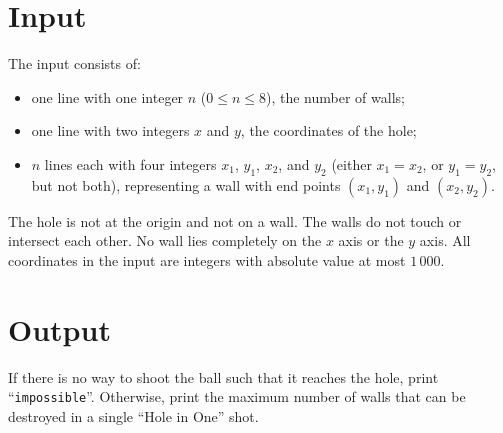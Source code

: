 \section*{Input}

The input consists of:
\begin{itemize}
\item one line with one integer $n$ ($0 \le n \le 8$), the number of walls;
\item one line with two integers $x$ and $y$, the coordinates of the hole;
\item $n$ lines each with four integers $x_1$, $y_1$, $x_2$, and $y_2$ (either $x_1 = x_2$, or $y_1 = y_2$, but not both), representing a wall with end points $(x_1, y_1)$ and $(x_2, y_2)$.
\end{itemize}

The hole is not at the origin and not on a wall.  The walls do not
touch or intersect each other.  No wall lies completely on the $x$
axis or the $y$ axis.
All coordinates in the input are integers with absolute value at most $1\,000$.

\section*{Output}

If there is no way to shoot the ball such that it reaches the hole, print ``\texttt{impossible}''.
Otherwise, print the maximum number of walls that can be destroyed in a single ``Hole in One'' shot.

